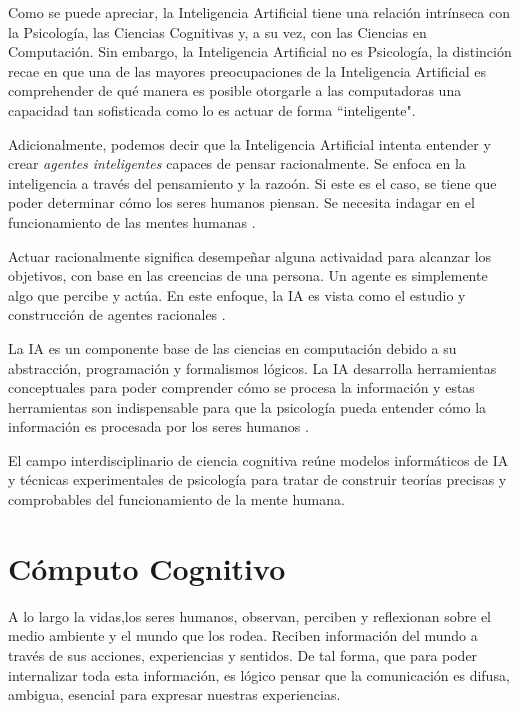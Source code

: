Como se puede apreciar, la Inteligencia Artificial tiene una relaci\'{o}n intr\'{i}nseca con la Psicolog\'{i}a, las Ciencias Cognitivas y, a su vez, con las Ciencias en Computaci\'{o}n. Sin embargo, la Inteligencia Artificial no es Psicolog\'{i}a, la distinci\'{o}n recae en que una de las mayores preocupaciones de la Inteligencia Artificial es comprehender de qu\'{e} manera es posible otorgarle a las computadoras una capacidad tan sofisticada como lo es actuar de forma “inteligente".

Adicionalmente, podemos decir que la Inteligencia Artificial intenta entender y crear \emph{agentes inteligentes} capaces de pensar racionalmente. Se enfoca en la inteligencia a trav\'{e}s del pensamiento y la razo\'{o}n. Si este es el caso, se tiene que poder determinar c\'{o}mo los seres humanos piensan. Se necesita indagar en el funcionamiento de las mentes humanas \cite{brooks1995intelligence}.

Actuar racionalmente significa desempe\~nar alguna activaidad para alcanzar los objetivos, con base en las creencias de una persona. Un agente es simplemente algo que percibe y actúa. En este enfoque, la IA es vista como el estudio y construcción de agentes racionales \cite{aimodern}.

La IA es un componente base de las ciencias en computaci\'{o}n debido a su abstracción, programación y formalismos lógicos. La IA  desarrolla  herramientas conceptuales para poder comprender c\'{o}mo se procesa la información y estas herramientas son indispensable para que la psicología pueda entender cómo la información es procesada por los seres humanos \cite{nilsson2014principles}.

El campo interdisciplinario de ciencia cognitiva reúne modelos informáticos de IA y técnicas experimentales de
psicología para tratar de construir teorías precisas y comprobables del funcionamiento de la mente humana.

\section{C\'{o}mputo Cognitivo}

A lo largo la vidas,los seres humanos, observan, perciben y reflexionan sobre el medio ambiente y el mundo que los rodea. Reciben informaci\'{o}n del mundo a trav\'{e}s de sus acciones, experiencias y sentidos. De tal forma, que para poder internalizar toda esta informaci\'{o}n, es l\'{o}gico pensar que la comunicaci\'{o}n es difusa, ambigua, esencial para expresar nuestras experiencias. 

